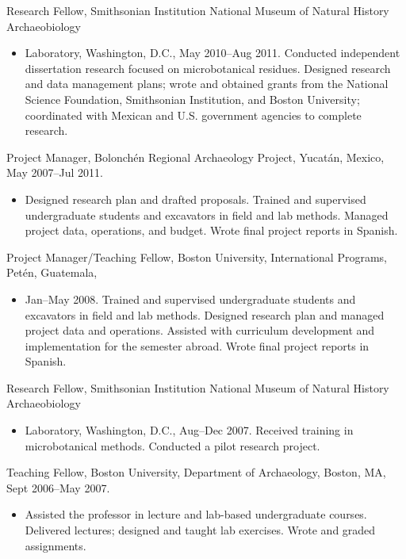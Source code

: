 \documentclass[10pt,centered]{res} %
\begin{document}
\begin{resume}
\begin{itemize}
\end{itemize}
\vspace*{-1em}
Research Fellow, Smithsonian Institution National Museum of Natural History Archaeobiology
\begin{itemize}
 \item[]Laboratory, Washington, D.C., May 2010--Aug 2011. Conducted independent dissertation research focused on microbotanical residues. Designed research and data management plans; wrote and obtained grants from the National Science Foundation, Smithsonian Institution, and Boston University; coordinated with Mexican and U.S. government agencies to complete research.
\end{itemize}
\vspace*{-1em}
Project Manager, Bolonch\'{e}n Regional Archaeology Project, Yucat\'{a}n, Mexico, May 2007--Jul 2011.
\begin{itemize}
 \item[] Designed research plan and drafted proposals. Trained and supervised undergraduate students and excavators in field and lab methods. Managed project data, operations, and budget. Wrote final project reports in Spanish.
\end{itemize}
\vspace*{-1em}
Project Manager/Teaching Fellow, Boston University, International Programs, Pet\'{e}n, Guatemala,
\begin{itemize}
 \item[]Jan--May 2008. Trained and supervised undergraduate students and excavators in field and lab methods. Designed research plan and managed project data and operations. Assisted with curriculum development and implementation for the semester abroad. Wrote final project reports in Spanish.
\end{itemize}
\newpage
Research Fellow, Smithsonian Institution National Museum of Natural History Archaeobiology
\begin{itemize}
 \item[]Laboratory, Washington, D.C., Aug--Dec 2007. Received training in microbotanical methods. Conducted a pilot research project.
\end{itemize}
\vspace*{-1em}
Teaching Fellow, Boston University, Department of Archaeology, Boston, MA, Sept 2006--May 2007.
\begin{itemize}
\item[] Assisted the professor in lecture and lab-based undergraduate courses. Delivered lectures; designed and taught lab exercises. Wrote and graded assignments.
\end{itemize}


\end{resume}
\end{document}
